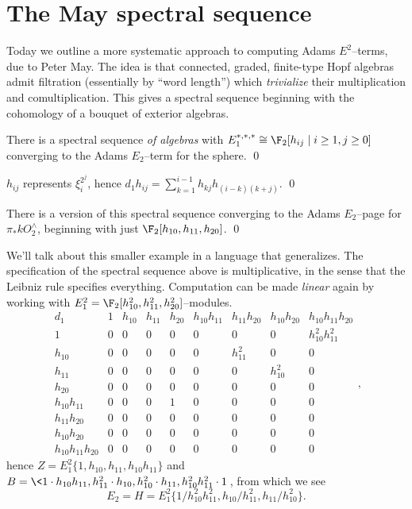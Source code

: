 \section{The May spectral sequence}

Today we outline a more systematic approach to computing Adams $E^2$--terms, due to Peter May.  The idea is that connected, graded, finite-type Hopf algebras admit filtration (essentially by ``word length'') which \emph{trivialize} their multiplication and comultiplication.  This gives a spectral sequence beginning with the cohomology of a bouquet of exterior algebras.

\begin{theorem}[May]
There is a spectral sequence \emph{of algebras} with $E_1^{*, *, *} \cong \F_2[h_{ij} \mid i \ge 1, j \ge 0]$ converging to the Adams $E_2$--term for the sphere. \qed
\end{theorem}

\begin{lemma}
$h_{ij}$ represents $\xi_i^{2^j}$, hence $d_1 h_{ij} = \sum_{k=1}^{i-1} h_{kj} h_{(i-k)(k+j)}$. \qed
\end{lemma}

\begin{lemma}
There is a version of this spectral sequence converging to the Adams $E_2$--page for $\pi_* kO^\wedge_2$, beginning with just $\F_2[h_{10}, h_{11}, h_{20}]$. \qed
\end{lemma}

We'll talk about this smaller example in a language that generalizes.  The specification of the spectral sequence above is multiplicative, in the sense that the Leibniz rule specifies everything.  Computation can be made \emph{linear} again by working with $E_1^2 = \F_2[h_{10}^2, h_{11}^2, h_{20}^2]$--modules.
\[
\begin{array}{c|cccccccc}
d_1 & 1 & h_{10} & h_{11} & h_{20} & h_{10} h_{11} & h_{11} h_{20} & h_{10} h_{20} & h_{10} h_{11} h_{20} \\
\hline
1                    & 0 & 0 & 0 & 0 & 0 &        0 &        0 & h_{10}^2 h_{11}^2 \\
h_{10}               & 0 & 0 & 0 & 0 & 0 & h_{11}^2 &        0 & 0 \\
h_{11}               & 0 & 0 & 0 & 0 & 0 &        0 & h_{10}^2 & 0 \\
h_{20}               & 0 & 0 & 0 & 0 & 0 &        0 &        0 & 0 \\
h_{10} h_{11}        & 0 & 0 & 0 & 1 & 0 &        0 &        0 & 0 \\
h_{11} h_{20}        & 0 & 0 & 0 & 0 & 0 &        0 &        0 & 0 \\
h_{10} h_{20}        & 0 & 0 & 0 & 0 & 0 &        0 &        0 & 0 \\
h_{10} h_{11} h_{20} & 0 & 0 & 0 & 0 & 0 &        0 &        0 & 0
\end{array},
\]
hence $Z = E_1^2\{1, h_{10}, h_{11}, h_{10} h_{11}\}$ and $B = \<1 \cdot h_{10} h_{11}, h_{11}^2 \cdot h_{10}, h_{10}^2 \cdot h_{11}, h_{10}^2 h_{11}^2 \cdot 1\>$, from which we see \[E_2 = H = E_1^2\{1 / h_{10}^2 h_{11}^2, h_{10} / h_{11}^2, h_{11} / h_{10}^2\}.\]

